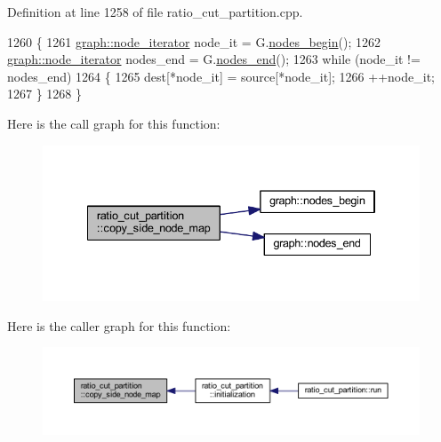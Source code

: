 Definition at line 1258 of file ratio\+\_\+cut\+\_\+partition.\+cpp.


\begin{DoxyCode}
1260 \{
1261     \mbox{\hyperlink{classgraph_a2cb374b84c133ce13f94e73c3e5da7fa}{graph::node\_iterator}} node\_it = G.\mbox{\hyperlink{classgraph_aec053a4b509d1be804237a80044c54c0}{nodes\_begin}}();
1262     \mbox{\hyperlink{classgraph_a2cb374b84c133ce13f94e73c3e5da7fa}{graph::node\_iterator}} nodes\_end = G.\mbox{\hyperlink{classgraph_abbf9c0cb5629e98e1142254911238173}{nodes\_end}}();
1263     \textcolor{keywordflow}{while} (node\_it != nodes\_end)
1264     \{
1265     dest[*node\_it] = source[*node\_it];
1266     ++node\_it;
1267     \}
1268 \}
\end{DoxyCode}
Here is the call graph for this function\+:\nopagebreak
\begin{figure}[H]
\begin{center}
\leavevmode
\includegraphics[width=334pt]{classratio__cut__partition_a8662bd1471d93d270de1c99d32ff3534_cgraph}
\end{center}
\end{figure}
Here is the caller graph for this function\+:\nopagebreak
\begin{figure}[H]
\begin{center}
\leavevmode
\includegraphics[width=350pt]{classratio__cut__partition_a8662bd1471d93d270de1c99d32ff3534_icgraph}
\end{center}
\end{figure}
\mbox{\label{classratio__cut__partition_a657a1d77b3b39037a52e6688674ad760}} 
